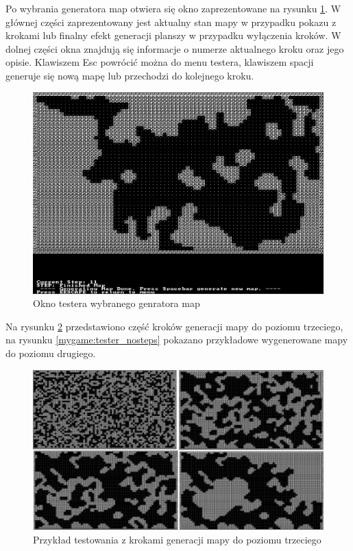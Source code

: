 \documentclass[12pt,twoside]{article}
\begin{document}
Po wybrania generatora map otwiera się okno zaprezentowane na rysunku \ref{mygame:window_tester}. W głównej części zaprezentowany jest aktualny stan mapy w przypadku pokazu z krokami lub finalny efekt generacji planszy w przypadku wyłączenia kroków. W dolnej części okna znajdują się informacje o numerze aktualnego kroku oraz jego opisie. Klawiszem Esc powrócić można do menu testera, klawiszem spacji generuje się nową mapę lub przechodzi do kolejnego kroku.

\FloatBarrier
\begin{figure}[h]
	\centering
	\includegraphics[width=14cm]{images/mygame/window_tester.png}
	\caption{Okno testera wybranego genratora map}
	\label{mygame:window_tester}
\end{figure}
\FloatBarrier

Na rysunku \ref{mygame:tester_steps} przedstawiono część kroków generacji mapy do poziomu trzeciego, na rysunku \ref{mygame:tester_nosteps} pokazano przykładowe wygenerowane mapy do poziomu drugiego.

\FloatBarrier
\begin{figure}[h]
	\centering
	\includegraphics[width=16cm]{images/mygame/tester_steps.png}
	\caption{Przykład testowania z krokami generacji mapy do poziomu trzeciego}
	\label{mygame:tester_steps}
\end{figure}
\FloatBarrier
\end{document}
